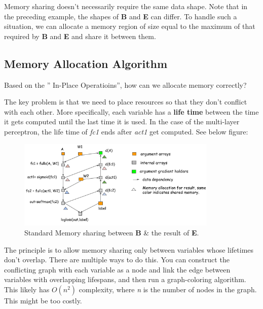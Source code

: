 Memory sharing doesn't necessarily require the same data shape. Note that in the preceding example, the shapes of \textbf{B} and \textbf{E} can differ. To handle such a situation, we can allocate a memory region of size equal to the maximum of that required by \textbf{B} and \textbf{E} and share it between them.

\subsection{Memory Allocation Algorithm}
Based on the '' In-Place Operatioins'', how can we allocate memory correctly?

The key problem is that we need to place resources so that they don’t conflict with each other. More specifically, each variable has a \textbf{life time} between the time it gets computed until the last time it is used. In the case of the multi-layer perceptron, the life time of \textit{fc1} ends after \textit{act1} get computed.
See below figure:
\begin{figure}[!hbtp]
\centering
\includegraphics[width=0.85\textwidth]{MXNet/alloc_mlp}
\caption{Standard Memory sharing between \textbf{B} \& the result of \textbf{E}.}
\end{figure}

The principle is to allow memory sharing only between variables whose lifetimes don’t overlap. There are multiple ways to do this. You can construct the conflicting graph with each variable as a node and link the edge between variables with overlapping lifespans, and then run a graph-coloring algorithm. This likely has $O(n^2)$ complexity, where \textit{n} is the number of nodes in the graph. This might be too costly.

